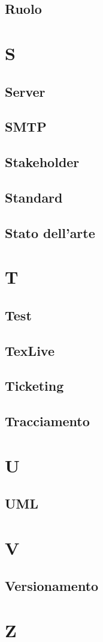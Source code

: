 \documentclass[12pt]{article}
\begin{document}
		\subsection{Ruolo}
	\clearpage
	\section{S}
		\subsection{Server}
		\subsection{SMTP}
		\subsection{Stakeholder}
		\subsection{Standard}
		\subsection{Stato dell'arte}
	\clearpage
	\section{T}
		\subsection{Test}
		\subsection{TexLive}
		\subsection{Ticketing}
		\subsection{Tracciamento}
	\clearpage
	\section{U}
		\subsection{UML}
	\clearpage
	\section{V}
		\subsection{Versionamento}
	\clearpage
	\section{Z}	
\end{document}
